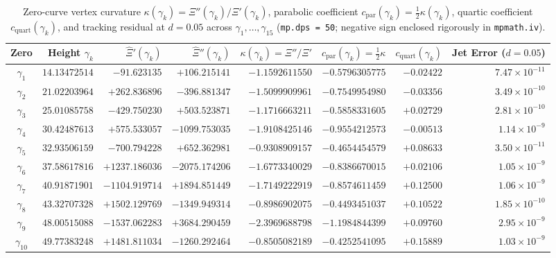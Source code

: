 \documentclass[11pt,a4paper,reqno]{amsart}
\theoremstyle{definition}
\theoremstyle{remark}
\numberwithin{equation}{section}
\begin{document}
\begin{table}[htbp]
\centering
\caption{Zero-curve vertex curvature $\kappa(\gamma_k) = \Xi''(\gamma_k)/\Xi'(\gamma_k)$, parabolic coefficient $c_{\mathrm{par}}(\gamma_k) = \frac{1}{2}\kappa(\gamma_k)$, quartic coefficient $c_{\mathrm{quart}}(\gamma_k)$, and tracking residual at $d = 0.05$ across $\gamma_1, \dots, \gamma_{15}$ (\texttt{mp.dps = 50}; negative sign enclosed rigorously in \texttt{mpmath.iv}).}\label{tab:curvature_15}
\scriptsize
\setlength{\tabcolsep}{3.2pt}
\begin{tabular}{crrrrrrr}
\toprule
\textbf{Zero} & \textbf{Height $\gamma_k$} & \textbf{$\widehat{\Xi}'(\gamma_k)$} & \textbf{$\widehat{\Xi}''(\gamma_k)$} & \textbf{$\kappa(\gamma_k) = \Xi''/\Xi'$} & \textbf{$c_{\mathrm{par}}(\gamma_k) = \tfrac{1}{2}\kappa$} & \textbf{$c_{\mathrm{quart}}(\gamma_k)$} & \textbf{Jet Error ($d=0.05$)} \\
\midrule
$\gamma_1$    & $14.13472514$ & $-91.623135$   & $+106.215141$  & $-1.1592611550$ & $-0.5796305775$ & $-0.02422$ & $7.47 \times 10^{-11}$ \\
$\gamma_2$    & $21.02203964$ & $+262.836896$  & $-396.881347$  & $-1.5099909961$ & $-0.7549954980$ & $-0.03356$ & $3.49 \times 10^{-10}$ \\
$\gamma_3$    & $25.01085758$ & $-429.750230$  & $+503.523871$  & $-1.1716663211$ & $-0.5858331605$ & $+0.02729$ & $2.81 \times 10^{-10}$ \\
$\gamma_4$    & $30.42487613$ & $+575.533057$  & $-1099.753035$ & $-1.9108425146$ & $-0.9554212573$ & $-0.00513$ & $1.14 \times 10^{-9}$  \\
$\gamma_5$    & $32.93506159$ & $-700.794228$  & $+652.362981$  & $-0.9308909157$ & $-0.4654454579$ & $+0.08633$ & $3.50 \times 10^{-11}$ \\
$\gamma_6$    & $37.58617816$ & $+1237.186036$ & $-2075.174206$ & $-1.6773340029$ & $-0.8386670015$ & $+0.02106$ & $1.05 \times 10^{-9}$  \\
$\gamma_7$    & $40.91871901$ & $-1104.919714$ & $+1894.851449$ & $-1.7149222919$ & $-0.8574611459$ & $+0.12500$ & $1.06 \times 10^{-9}$  \\
$\gamma_8$    & $43.32707328$ & $+1502.129769$ & $-1349.949314$ & $-0.8986902075$ & $-0.4493451037$ & $+0.10522$ & $1.85 \times 10^{-10}$ \\
$\gamma_9$    & $48.00515088$ & $-1537.062283$ & $+3684.290459$ & $-2.3969688798$ & $-1.1984844399$ & $+0.09760$ & $2.95 \times 10^{-9}$  \\
$\gamma_{10}$ & $49.77383248$ & $+1481.811034$ & $-1260.292464$ & $-0.8505082189$ & $-0.4252541095$ & $+0.15889$ & $1.03 \times 10^{-9}$  \\

\end{tabular}
\end{table}
\end{document}
